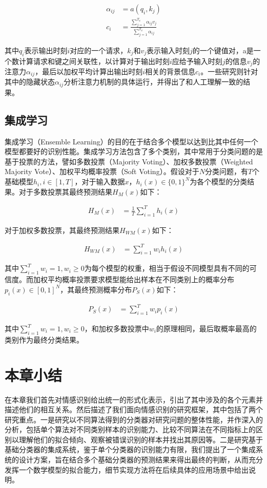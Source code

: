\begin{align}
  \alpha_{ij} &= a(q_i, k_j) \\
  c_i &= \frac
    {\sum\limits_{j=1}^{T_x}{\alpha_{ij}v_j}}
    {\sum\limits_{j=1}^{T_x}{\alpha_{ij}}}
\end{align}

其中$q_i$表示输出时刻$i$对应的一个请求，$k_j$和$v_j$表示输入时刻$j$的一个键值对，a是一个数计算请求和键之间关联性，以计算对于输出时刻$i$应给予输入时刻$j$的信息$v_j$的注意力$\alpha_{ij}$，最后以加权平均计算出输出时刻$i$相关的背景信息$c_i$。一些研究\cite{wang2016attention}\cite{pontiki2014semeval}则针对其中的隐藏状态$\alpha_{ij}$分析注意力机制的具体运行，并得出了和人工理解一致的结果。

\subsection{集成学习}
\label{ssec:intro_ensemble_learning}

集成学习（Ensemble Learning）的目的在于结合多个模型以达到比其中任何一个模型都要好的识别性能。集成学习方法包含了多个类别，其中常用于分类问题的是基于投票的方法，譬如多数投票（Majority Voting）、加权多数投票（Weighted Majority Vote）、加权平均概率投票（Soft Voting）。假设对于$N$分类问题，有$T$个基础模型$h_i, i \in [1, T]$，对于输入数据$x$，$h_i(x) \in \{0, 1\}^N$为各个模型的分类结果。对于多数投票其最终预测结果$H_M(x)$如下：

\begin{align}
  H_{M}(x) &= \frac{1}{T} \sum\limits_{i=1}^{T}h_i(x)
\end{align}

对于加权多数投票，其最终预测结果$H_{WM}(x)$如下：

\begin{align}
  H_{WM}(x) &= \sum\limits_{i=1}^{T}w_i h_i(x)
\end{align}

其中$\sum\limits_{i=1}^{T}w_i = 1, w_i \geq 0$为每个模型的权重，相当于假设不同模型具有不同的可信度。而加权平均概率投票要求模型能给出样本在不同类别上的概率分布$p_i(x) \in [0, 1]^N$，其最终预测概率分布$P_S(x)$如下：

\begin{align}
  P_{S}(x) &= \sum\limits_{i=1}^{T}w_i p_i(x)
\end{align}

其中$\sum\limits_{i=1}^{T}w_i = 1, w_i \geq 0$，和加权多数投票中$w_i$的原理相同，最后取概率最高的类别作为最终分类结果。

\section{本章小结}

在本章我们首先对情感识别给出统一的形式化表示，引出了其中涉及的各个元素并描述他们的相互关系。然后描述了我们面向情感识别的研究框架，其中包括了两个研究重点。一是研究以不同算法得到的分类器对研究问题的整体性能，并作深入的分析，包括单个算法对不同类别样本的识别能力、比较不同算法在不同指标上的区别以理解他们的拟合倾向、观察被错误识别的样本并找出其原因等。二是研究基于基础分类器的集成系统，鉴于单个分类器的识别能力有限，我们提出了一个集成系统的设计方案，旨在结合多个基础分类器的预测结果来得出最终的判断，从而充分发挥一个数学模型的拟合能力，细节实现方法将在后续具体的应用场景中给出说明。



